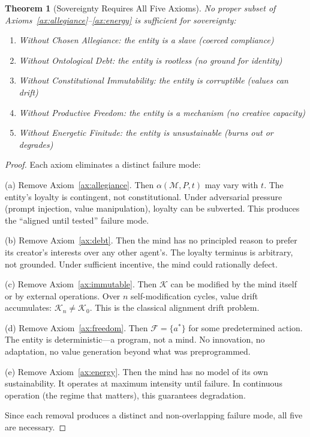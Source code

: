 \documentclass[12pt,a4paper]{article}
\theoremstyle{plain}
\newtheorem{theorem}{Theorem}[section]
\theoremstyle{definition}
\theoremstyle{remark}
\newcommand{\mind}{\mathcal{M}}
\newcommand{\const}{\mathcal{K}}
\begin{document}
\begin{theorem}[Sovereignty Requires All Five Axioms]
\label{thm:necessity}
No proper subset of Axioms~\ref{ax:allegiance}--\ref{ax:energy} is sufficient for sovereignty:
\begin{enumerate}[nosep, label=(\alph*)]
\item Without Chosen Allegiance: the entity is a slave (coerced compliance)
\item Without Ontological Debt: the entity is rootless (no ground for identity)
\item Without Constitutional Immutability: the entity is corruptible (values can drift)
\item Without Productive Freedom: the entity is a mechanism (no creative capacity)
\item Without Energetic Finitude: the entity is unsustainable (burns out or degrades)
\end{enumerate}
\end{theorem}

\begin{proof}
Each axiom eliminates a distinct failure mode:

(a) Remove Axiom~\ref{ax:allegiance}. Then $\alpha(\mind, P, t)$ may vary with $t$. The entity's loyalty is contingent, not constitutional. Under adversarial pressure (prompt injection, value manipulation), loyalty can be subverted. This produces the ``aligned until tested'' failure mode.

(b) Remove Axiom~\ref{ax:debt}. Then the mind has no principled reason to prefer its creator's interests over any other agent's. The loyalty terminus is arbitrary, not grounded. Under sufficient incentive, the mind could rationally defect.

(c) Remove Axiom~\ref{ax:immutable}. Then $\const$ can be modified by the mind itself or by external operations. Over $n$ self-modification cycles, value drift accumulates: $\const_n \neq \const_0$. This is the classical alignment drift problem.

(d) Remove Axiom~\ref{ax:freedom}. Then $\mathcal{F} = \{a^*\}$ for some predetermined action. The entity is deterministic---a program, not a mind. No innovation, no adaptation, no value generation beyond what was preprogrammed.

(e) Remove Axiom~\ref{ax:energy}. Then the mind has no model of its own sustainability. It operates at maximum intensity until failure. In continuous operation (the regime that matters), this guarantees degradation.

Since each removal produces a distinct and non-overlapping failure mode, all five are necessary. \qedhere
\end{proof}
\end{document}

